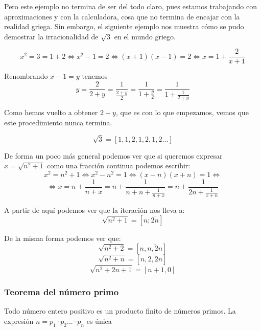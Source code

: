 \documentclass{apuntes}
\begin{document}
Pero este ejemplo no termina de ser del todo claro, pues estamos trabajando con aproximaciones y con la calculadora, cosa que no termina de encajar con la realidad griega. Sin embargo, el siguiente ejemplo nos muestra cómo se pudo demostrar la irracionalidad de $\sqrt{3}$ en el mundo griego.

\begin{example}
\[x^2=3=1+2 \iff x^2-1 = 2 \iff (x+1)(x-1) = 2 \iff x=1+\frac{2}{x+1}\]

Renombrando $x-1=y$ tenemos
\[y = \frac{2}{2+y} = \frac{1}{\frac{2+y}{2}} =\frac{1}{1+\frac{y}{2}} = \frac{1}{1+\frac{1}{2+y}}\]

Como hemos vuelto a obtener $2+y$, que es con lo que empezamos, vemos que este procedimiento nunca termina.

\[\sqrt{3}=[1,1,2,1,2,1,2...]\]

\end{example}

De forma un poco más general podemos ver que si queremos expresar $x=\sqrt{n^2+1}$ como una fracción continua podemos escribir:
\[x^2=n^2+1 \iff x^2-n^2 = 1 \iff (x-n)(x+n) = 1 \iff \]
\[\iff x = n + \frac{1}{n+x}=n+\frac{1}{n+n+\frac{1}{n+x}} = n + \frac{1}{2n + \frac{1}{x+n}}\]

A partir de aquí podemos ver que la iteración nos lleva a:
\[\sqrt{n^2+1} = [n;\overline{2n}]\]

De la misma forma podemos ver que:
\[\sqrt{n^2+2} = [n,\overline{n,2n}]\]
\[\sqrt{n^2+n} = [n,\overline{2,2n}]\]
\[\sqrt{n^2+2n+1} = [n+1, 0]\]
\subsubsection{Teorema del número primo}
\begin{theorem}
Todo número entero positivo es un producto finito de números primos. La expresión $n=p_1\cdot p_2 ... \cdot p_n$ es única
\end{theorem}
\end{document}
